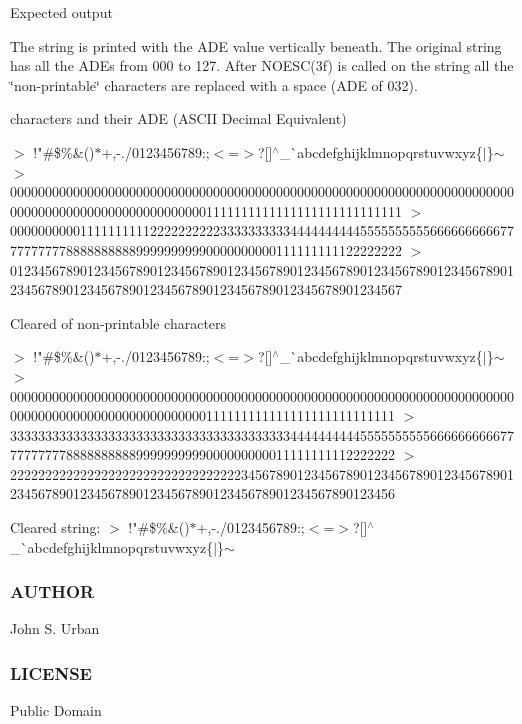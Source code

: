 Expected output

The string is printed with the A\+DE value vertically beneath. The original string has all the A\+D\+Es from 000 to 127. After N\+O\+E\+S\+C(3f) is called on the string all the \char`\"{}non-\/printable\char`\"{} characters are replaced with a space (A\+DE of 032).

characters and their A\+DE (A\+S\+C\+II Decimal Equivalent)

$>$ !"\#\$\%\&\textquotesingle{}()$\ast$+,-\/./0123456789\+:;$<$=$>$?\mbox{[}\mbox{]}$^\wedge$\+\_\+\`{}abcdefghijklmnopqrstuvwxyz\{$\vert$\}$\sim$ $>$00000000000000000000000000000000000000000000000000000000000000000000000000000000000000000000000000001111111111111111111111111111 $>$00000000001111111111222222222233333333334444444444555555555566666666667777777777888888888899999999990000000000111111111122222222 $>$01234567890123456789012345678901234567890123456789012345678901234567890123456789012345678901234567890123456789012345678901234567

Cleared of non-\/printable characters

$>$ !"\#\$\%\&\textquotesingle{}()$\ast$+,-\/./0123456789\+:;$<$=$>$?\mbox{[}\mbox{]}$^\wedge$\+\_\+\`{}abcdefghijklmnopqrstuvwxyz\{$\vert$\}$\sim$ $>$0000000000000000000000000000000000000000000000000000000000000000000000000000000000000000000000000000111111111111111111111111111 $>$3333333333333333333333333333333333333333444444444455555555556666666666777777777788888888889999999999000000000011111111112222222 $>$2222222222222222222222222222222223456789012345678901234567890123456789012345678901234567890123456789012345678901234567890123456

Cleared string\+: $>$ !"\#\$\%\&\textquotesingle{}()$\ast$+,-\/./0123456789\+:;$<$=$>$?\mbox{[}\mbox{]}$^\wedge$\+\_\+\`{}abcdefghijklmnopqrstuvwxyz\{$\vert$\}$\sim$ \subsubsection*{A\+U\+T\+H\+OR}

John S. Urban \subsubsection*{L\+I\+C\+E\+N\+SE}

Public Domain \mbox{\label{namespacem__strings_ad007f050abe3d142f4a7badbc4408685}} 
